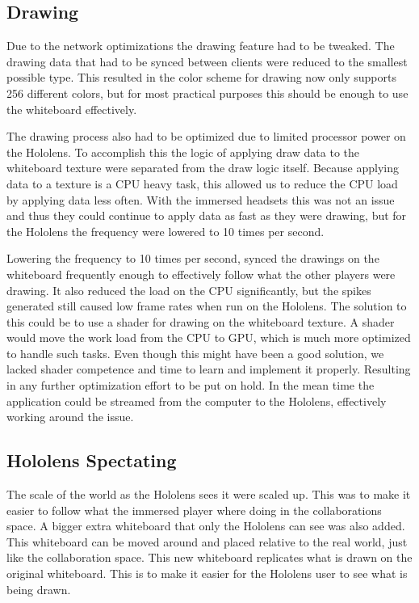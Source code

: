         \subsection{Drawing}
        Due to the network optimizations the drawing feature had to be tweaked. The drawing data that had to be synced between clients were reduced to the smallest possible type. This resulted in the color scheme for drawing now only supports 256 different colors, but for most practical purposes this should be enough to use the whiteboard effectively.
        
        The drawing process also had to be optimized due to limited processor power on the Hololens. To accomplish this the logic of applying draw data to the whiteboard texture were separated from the draw logic itself. Because applying data to a texture is a CPU heavy task, this allowed us to reduce the CPU load by applying data less often. With the immersed headsets this was not an issue and thus they could continue to apply data as fast as they were drawing, but for the Hololens the frequency were lowered to 10 times per second. 
        
        Lowering the frequency to 10 times per second, synced the drawings on the whiteboard frequently enough to effectively follow what the other players were drawing. It also reduced the load on the CPU significantly, but the spikes generated still caused low frame rates when run on the Hololens. The solution to this could be to use a shader for drawing on the whiteboard texture. A shader would move the work load from the CPU to GPU, which is much more optimized to handle such tasks. Even though this might have been a good solution, we lacked shader competence and time to learn and implement it properly. Resulting in any further optimization effort to be put on hold. In the mean time the application could be streamed from the computer to the Hololens, effectively working around the issue.
        
        \subsection{Hololens Spectating}
        The scale of the world as the Hololens sees it were scaled up. This was to make it easier to follow what the immersed player where doing in the collaborations space. A bigger extra whiteboard that only the Hololens can see was also added. This whiteboard can be moved around and placed relative to the real world, just like the collaboration space. This new whiteboard replicates what is drawn on the original whiteboard. This is to make it easier for the Hololens user to see what is being drawn.
        
